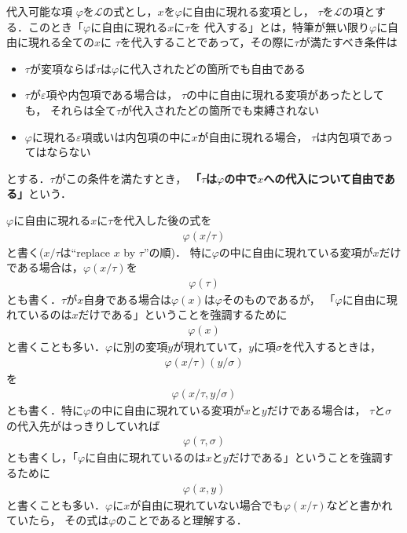 	\begin{itembox}[l]{代入可能な項}
		$\varphi$を$\mathcal{L}$の式とし，$x$を$\varphi$に自由に現れる変項とし，
		$\tau$を$\mathcal{L}$の項とする．このとき「$\varphi$に自由に現れる$x$に$\tau$を
		代入する」とは，特筆が無い限り$\varphi$に自由に現れる全ての$x$に
		$\tau$を代入することであって，その際に$\tau$が満たすべき条件は
		\begin{itemize}
			\item $\tau$が変項ならば$\tau$は$\varphi$に代入されたどの箇所でも自由である
			\item $\tau$が$\varepsilon$項や内包項である場合は，
				$\tau$の中に自由に現れる変項があったとしても，
				それらは全て$\tau$が代入されたどの箇所でも束縛されない
			\item $\varphi$に現れる$\varepsilon$項或いは内包項の中に$x$が自由に現れる場合，
				$\tau$は内包項であってはならない
		\end{itemize}
		とする．$\tau$がこの条件を満たすとき，
		{\bf 「$\tau$は$\varphi$の中で$x$への代入について自由である」}という．
	\end{itembox}
	
	$\varphi$に自由に現れる$x$に$\tau$を代入した後の式を
	\begin{align}
		\varphi(x/\tau)
	\end{align}
	と書く($x/\tau$は``replace $x$ by $\tau$''の順)．
	特に$\varphi$の中に自由に現れている変項が$x$だけである場合は，$\varphi(x/\tau)$を
	\begin{align}
		\varphi(\tau)
	\end{align}
	とも書く．$\tau$が$x$自身である場合は$\varphi(x)$は$\varphi$そのものであるが，
	「$\varphi$に自由に現れているのは$x$だけである」ということを強調するために
	\begin{align}
		\varphi(x)
	\end{align}
	と書くことも多い．$\varphi$に別の変項$y$が現れていて，$y$に項$\sigma$を代入するときは，
	\begin{align}
		\varphi(x/\tau)(y/\sigma)
	\end{align}
	を
	\begin{align}
		\varphi(x/\tau,y/\sigma)
	\end{align}
	とも書く．特に$\varphi$の中に自由に現れている変項が$x$と$y$だけである場合は，
	$\tau$と$\sigma$の代入先がはっきりしていれば
	\begin{align}
		\varphi(\tau,\sigma)
	\end{align}
	とも書くし，「$\varphi$に自由に現れているのは$x$と$y$だけである」ということを強調するために
	\begin{align}
		\varphi(x,y)
	\end{align}
	と書くことも多い．$\varphi$に$x$が自由に現れていない場合でも$\varphi(x/\tau)$などと書かれていたら，
	その式は$\varphi$のことであると理解する．